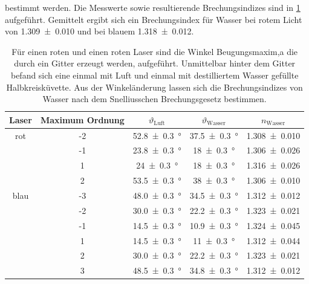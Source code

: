 \documentclass[
	a4paper,
	12pt,
	pagesize,
	ngerman
]{scrartcl}
\begin{document}
	bestimmt werden.
	Die Messwerte sowie resultierende Brechungsindizes sind in \cref{tab_wasser} aufgeführt.
	Gemittelt ergibt sich ein Brechungsindex für Wasser bei rotem Licht von \SI{1,309 +- 0,010}{} und bei blauem \SI{1,318 +- 0,012}{}.
	\begin{table}[H] %
		\centering
		\begin{tabular}{ c | c | c | c | c}
			Laser & Maximum Ordnung & $\vartheta_\text{Luft}$ & $\vartheta_\text{Wasser}$ & $n_\text{Wasser}$ \\ \hline
			rot & -2 &\SI{52,8 +- 0,3}{\degree} & \SI{37,5 +-0,3}{\degree} & \SI{1,308 +- 0,010}{}\\
			& -1 &\SI{23,8 +- 0,3}{\degree} & \SI{18+-0,3}{\degree} & \SI{1,306 +- 0,026}{}\\
			& 1 &\SI{24 +- 0,3}{\degree} & \SI{18+-0,3}{\degree} & \SI{1,316 +- 0,026}{}\\
			& 2 &\SI{53,5 +- 0,3}{\degree} & \SI{38+-0,3}{\degree} & \SI{1,306 +- 0,010}{}\\ \hline
			blau & -3 & \SI{48,0 +- 0,3}{\degree}&\SI{34,5+-0,3}{\degree}& \SI{1,312 +- 0,012}{} \\
			& -2 & \SI{30,0 +- 0,3}{\degree}&\SI{22,2+-0,3}{\degree}& \SI{1,323 +- 0,021}{} \\
			& -1 & \SI{14,5 +- 0,3}{\degree}&\SI{10,9+-0,3}{\degree}& \SI{1,324 +- 0,045}{} \\
			& 1 & \SI{14,5 +- 0,3}{\degree}&\SI{11+-0,3}{\degree}& \SI{1,312 +- 0,044}{} \\
			& 2 & \SI{30,0 +- 0,3}{\degree}&\SI{22,2+-0,3}{\degree}& \SI{1,323 +- 0,021}{} \\
			& 3 & \SI{48,5 +- 0,3}{\degree}&\SI{34,8+-0,3}{\degree}& \SI{1,312 +- 0,012}{} \\

		\end{tabular}
		\caption{Für einen roten und einen roten Laser sind die Winkel Beugungsmaxim,a die durch ein Gitter erzeugt werden, aufgeführt. Unmittelbar hinter dem Gitter befand sich eine einmal mit Luft und einmal mit destilliertem Wasser gefüllte Halbkreisküvette. Aus der Winkeländerung lassen sich die Brechungsindizes von Wasser nach dem Snelliusschen Brechungsgesetz bestimmen.} 
		\label{tab_wasser}
	\end{table}
	
\end{document}
